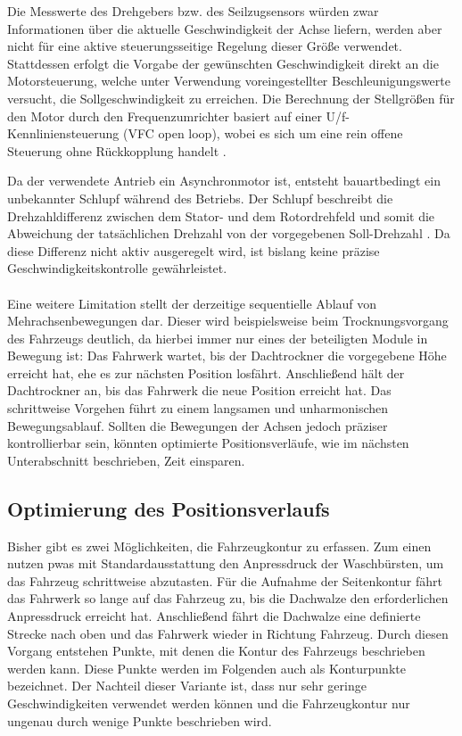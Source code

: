 Die Messwerte des Drehgebers bzw. des Seilzugsensors würden zwar Informationen über die aktuelle Geschwindigkeit der Achse liefern, werden aber nicht für eine aktive steuerungsseitige Regelung dieser Größe verwendet. Stattdessen erfolgt die Vorgabe der gewünschten Geschwindigkeit direkt an die Motorsteuerung, welche unter Verwendung voreingestellter Beschleunigungswerte versucht, die Sollgeschwindigkeit zu erreichen. Die Berechnung der Stellgrößen für den Motor durch den Frequenzumrichter basiert auf einer U/f-Kennliniensteuerung (VFC open loop), wobei es sich um eine rein offene Steuerung ohne Rückkopplung handelt  \cite{lenze}.

Da der verwendete Antrieb ein Asynchronmotor ist, entsteht bauartbedingt ein unbekannter Schlupf während des Betriebs. Der Schlupf beschreibt die Drehzahldifferenz zwischen dem Stator- und dem Rotordrehfeld und somit die Abweichung der tatsächlichen Drehzahl von der vorgegebenen Soll-Drehzahl \cite{antriebstechnik}. Da diese Differenz nicht aktiv ausgeregelt wird, ist bislang keine präzise Geschwindigkeitskontrolle gewährleistet.\\
\\
Eine weitere Limitation stellt der derzeitige sequentielle Ablauf von Mehrachsenbewegungen dar. Dieser wird beispielsweise beim Trocknungsvorgang des Fahrzeugs deutlich, da hierbei immer nur eines der beteiligten Module in Bewegung ist: Das Fahrwerk wartet, bis der Dachtrockner die vorgegebene Höhe erreicht hat, ehe es zur nächsten Position losfährt. Anschließend hält der Dachtrockner an, bis das Fahrwerk die neue Position erreicht hat. Das schrittweise Vorgehen führt zu einem langsamen und unharmonischen Bewegungsablauf. Sollten die Bewegungen der Achsen jedoch präziser kontrollierbar sein, könnten optimierte Positionsverläufe, wie im nächsten Unterabschnitt beschrieben, Zeit einsparen.

\subsection{Optimierung des Positionsverlaufs}
Bisher gibt es zwei Möglichkeiten, die Fahrzeugkontur zu erfassen. Zum einen nutzen \acp{pwa} mit Standardausstattung den Anpressdruck der Waschbürsten, um das Fahrzeug schrittweise abzutasten. Für die Aufnahme der Seitenkontur fährt das Fahrwerk so lange auf das Fahrzeug zu, bis die Dachwalze den erforderlichen Anpressdruck erreicht hat. Anschließend fährt die Dachwalze eine definierte Strecke nach oben und das Fahrwerk wieder in Richtung Fahrzeug. Durch diesen Vorgang entstehen Punkte, mit denen die Kontur des Fahrzeugs beschrieben werden kann. Diese Punkte werden im Folgenden auch als Konturpunkte bezeichnet. Der Nachteil dieser Variante ist, dass nur sehr geringe Geschwindigkeiten verwendet werden können und die Fahrzeugkontur nur ungenau durch wenige Punkte beschrieben wird.

